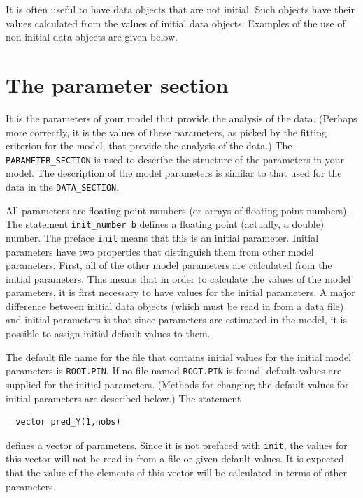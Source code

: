 \documentclass{admbmanual}
\newcommand\DS{\texttt{DATA\_SECTION}}
\begin{document}
It is often useful to have data objects that are not initial. Such objects have
their values calculated from the values of initial data objects. Examples of the
use of non-initial data objects are given below.

\section{The parameter section}

It is the parameters of your model that provide the analysis of the data.
(Perhaps more correctly, it is the values of these parameters, as picked by the
fitting criterion for the model, that provide the analysis of the data.) The
\texttt{PARAMETER\_SECTION} is used to describe the structure of the parameters
in your model. The description of the model parameters is similar to that used
for the data in the \DS.

All parameters are floating point numbers (or arrays of floating point numbers).
The statement \texttt{init\_number b} defines a floating point (actually, a
double) number. The preface \texttt{init} means that this is an initial
parameter. Initial parameters have two properties that distinguish them from
other model parameters. First, all of the other model parameters are calculated
from the initial parameters. This means that in order to calculate the values of
the model parameters, it is first necessary to have values for the initial
parameters. A major difference between initial data objects (which must be read
in from a data file) and initial parameters is that since parameters are
estimated in the model, it is possible to assign initial default values to them.

The default file name for the file that contains initial values for the initial
model parameters is \texttt{ROOT.PIN}. If no file named \texttt{ROOT.PIN} is
found, default values are supplied for the initial parameters. (Methods for
changing the default values for initial parameters are described below.) The
statement
\begin{lstlisting}
  vector pred_Y(1,nobs)
\end{lstlisting}
defines a vector of parameters. Since it is not prefaced with \texttt{init}, the
values for this vector will not be read in from a file or given default values.
It is expected that the value of the elements of this vector will be calculated
in terms of other parameters.
\end{document}
